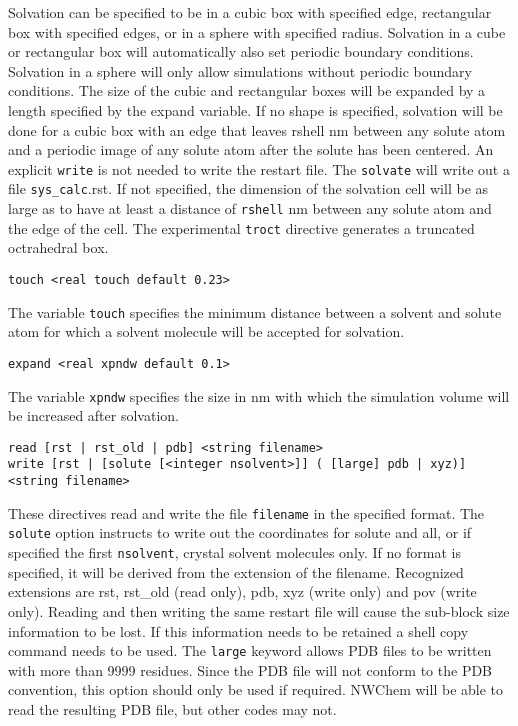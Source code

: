 Solvation can be specified to be in a cubic box with specified edge,
rectangular box with specified edges, or in a sphere with specified
radius. Solvation in a cube or rectangular box will automatically also
set periodic boundary conditions. Solvation in a sphere will only allow
simulations without periodic boundary conditions. The size of the cubic
and rectangular boxes will be expanded by a length specified by the
expand variable. If no shape is specified, solvation will be done for
a cubic box with an edge that leaves rshell nm between any solute atom and
a periodic image of any solute atom after the solute has been centered. 
An explicit \verb+write+ is not needed to write the restart file. 
The \verb+solvate+ will write out a file \verb+sys_calc+.rst.
If not specified, the dimension of the solvation cell will be as large
as to have at least a distance of \verb+rshell+ nm between any solute atom
and the edge of the cell. The experimental \verb+troct+ directive generates 
a truncated octrahedral box.

\begin{verbatim}
touch <real touch default 0.23>
\end{verbatim}

The variable \verb+touch+ specifies the minimum distance between a solvent 
and solute atom for which a solvent molecule will be accepted for solvation.

\begin{verbatim}
expand <real xpndw default 0.1>
\end{verbatim}

The variable \verb+xpndw+ specifies the size in nm with which the simulation
volume will be increased after solvation.

\begin{verbatim}
read [rst | rst_old | pdb] <string filename>
write [rst | [solute [<integer nsolvent>]] ( [large] pdb | xyz)] <string filename>
\end{verbatim}

These directives read and write the file \verb+filename+ in the specified
format. The \verb+solute+ option instructs to write out the coordinates
for solute and all, or if specified the first \verb+nsolvent+, crystal solvent 
molecules only.
If no format is specified, it will be derived from the extension of the
filename. Recognized extensions are rst, rst\_old (read only), pdb, xyz
(write only) and pov (write only).
Reading and then writing the same restart file will cause the
sub-block size information to be lost. If this information needs to be
retained a shell copy command needs to be used.
The \verb+large+ keyword allows PDB files to be written with more than 9999
residues. Since the PDB file will not conform to the PDB convention, this
option should only be used if required. NWChem will be able to read the
resulting PDB file, but other codes may not.

